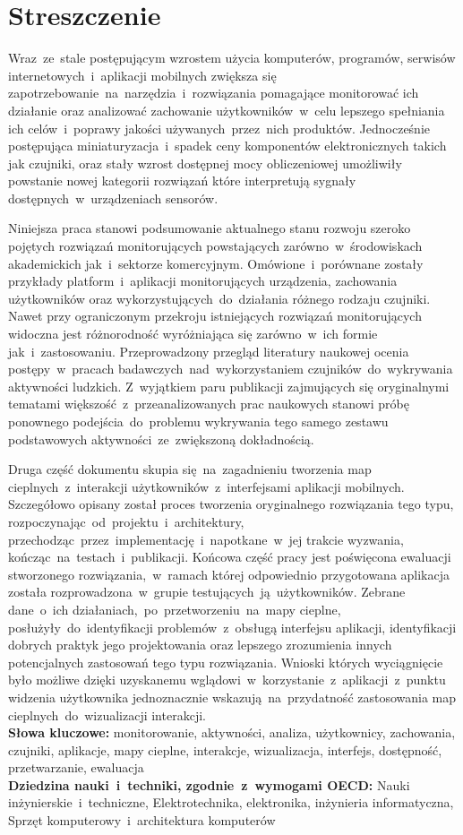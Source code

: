 \chapter*{Streszczenie}
Wraz~ze~stale postępującym wzrostem użycia komputerów, programów, serwisów internetowych~i~aplikacji mobilnych zwiększa się zapotrzebowanie~na~narzędzia~i~rozwiązania pomagające monitorować ich działanie oraz analizować zachowanie użytkowników~w~celu lepszego spełniania ich celów~i~poprawy jakości używanych~przez~nich produktów. Jednocześnie postępująca miniaturyzacja~i~spadek ceny komponentów elektronicznych takich jak czujniki, oraz stały wzrost dostępnej mocy obliczeniowej umożliwiły powstanie nowej kategorii rozwiązań które interpretują sygnały dostępnych~w~urządzeniach sensorów. 

Niniejsza praca stanowi podsumowanie aktualnego stanu rozwoju szeroko pojętych rozwiązań monitorujących powstających zarówno~w~środowiskach akademickich jak~i~sektorze komercyjnym. Omówione~i~porównane zostały przykłady platform~i~aplikacji monitorujących urządzenia, zachowania użytkowników oraz wykorzystujących~do~działania różnego rodzaju czujniki. Nawet przy ograniczonym przekroju istniejących rozwiązań monitorujących widoczna jest różnorodność wyróżniająca się zarówno~w~ich formie jak~i~zastosowaniu. Przeprowadzony przegląd literatury naukowej ocenia postępy~w~pracach badawczych~nad~wykorzystaniem czujników~do~wykrywania aktywności ludzkich. Z~wyjątkiem paru publikacji zajmujących się oryginalnymi tematami większość~z~przeanalizowanych prac naukowych stanowi próbę ponownego podejścia~do~problemu wykrywania tego samego zestawu podstawowych aktywności~ze~zwiększoną dokładnością. 

Druga część dokumentu skupia się~na~zagadnieniu tworzenia map cieplnych~z~interakcji użytkowników~z~interfejsami aplikacji mobilnych. Szczegółowo opisany został proces tworzenia oryginalnego rozwiązania tego typu, rozpoczynając~od~projektu~i~architektury, przechodząc~przez~implementację~i~napotkane~w~jej trakcie wyzwania, kończąc~na~testach~i~publikacji. Końcowa część pracy jest poświęcona ewaluacji stworzonego rozwiązania,~w~ramach której odpowiednio przygotowana aplikacja została rozprowadzona~w~grupie testujących~ją~użytkowników. Zebrane dane~o~ich działaniach,~po~przetworzeniu~na~mapy cieplne, posłużyły~do~identyfikacji problemów~z~obsługą interfejsu aplikacji, identyfikacji dobrych praktyk jego projektowania oraz lepszego zrozumienia innych potencjalnych zastosowań tego typu rozwiązania. Wnioski których wyciągnięcie było możliwe dzięki uzyskanemu wglądowi~w~korzystanie~z~aplikacji~z~punktu widzenia użytkownika jednoznacznie wskazują~na~przydatność zastosowania map cieplnych~do~wizualizacji interakcji. \\

\noindent\textbf{Słowa kluczowe:} monitorowanie, aktywności, analiza, użytkownicy, zachowania, czujniki, aplikacje, mapy cieplne, interakcje, wizualizacja, interfejs, dostępność, przetwarzanie, ewaluacja \\

\noindent\textbf{Dziedzina nauki~i~techniki, zgodnie~z~wymogami OECD:} Nauki inżynierskie~i~techniczne, Elektrotechnika, elektronika, inżynieria informatyczna, Sprzęt komputerowy~i~architektura komputerów

